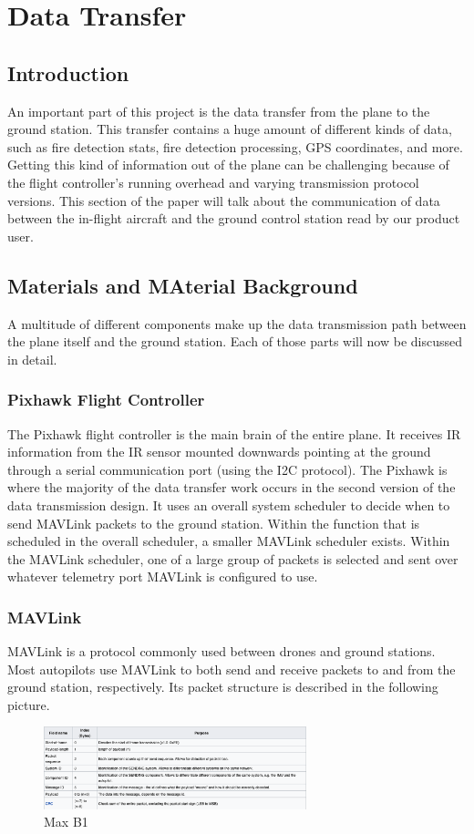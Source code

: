 \documentclass[12pt,journal,compsoc]{IEEEtran}
\begin{document}
\section{Data Transfer}
\subsection{Introduction}
An important part of this project is the data transfer from the plane to the ground station. This transfer contains a huge amount of different kinds of data, such as fire detection stats, fire detection processing, GPS coordinates, and more. Getting this kind of information out of the plane can be challenging because of the flight controller's running overhead and varying transmission protocol versions. This section of the paper will talk about the communication of data between the in-flight aircraft and the ground control station read by our product user.

\subsection{Materials and MAterial Background}
A multitude of different components make up the data transmission path between the plane itself and the ground station. Each of those parts will now be discussed in detail.
\subsubsection{Pixhawk Flight Controller}
The Pixhawk flight controller is the main brain of the entire plane. It receives IR information from the IR sensor mounted downwards pointing at the ground through a serial communication port (using the I2C protocol). The Pixhawk is where the majority of the data transfer work occurs in the second version of the data transmission design. It uses an overall system scheduler to decide when to send MAVLink packets to the ground station. Within the function that is scheduled in the overall scheduler, a smaller MAVLink scheduler exists. Within the MAVLink scheduler, one of a large group of packets is selected and sent over whatever telemetry port MAVLink is configured to use.
\subsubsection{MAVLink}
MAVLink is a protocol commonly used between drones and ground stations. Most autopilots use MAVLink to both send and receive packets to and from the ground station, respectively. Its packet structure is described in the following picture.
\begin{figure}[h!]
\hspace*{0cm}
\centering
\includegraphics[width=3in]{MavlinkStructure.png}
\caption{Max B1}
\label{mavStruct}
\end{figure}
\end{document}
